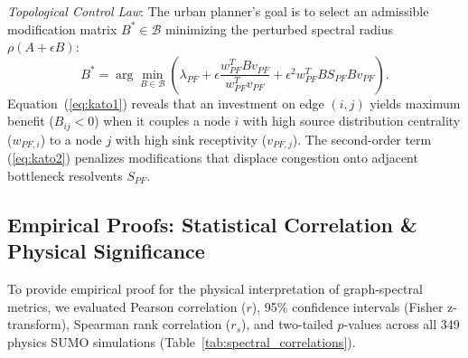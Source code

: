 \documentclass[lettersize,journal]{IEEEtran}
\begin{document}
\textit{Topological Control Law}: The urban planner's goal is to select an admissible modification matrix $B^* \in \mathcal{B}$ minimizing the perturbed spectral radius $\rho(A + \epsilon B)$:
\begin{equation}
B^* = \arg\min_{B \in \mathcal{B}} \left( \lambda_{PF} + \epsilon \frac{w_{PF}^T B v_{PF}}{w_{PF}^T v_{PF}} + \epsilon^2 w_{PF}^T B S_{PF} B v_{PF} \right).
\end{equation}
Equation~(\ref{eq:kato1}) reveals that an investment on edge $(i, j)$ yields maximum benefit ($B_{ij} < 0$) when it couples a node $i$ with high source distribution centrality ($w_{PF, i}$) to a node $j$ with high sink receptivity ($v_{PF, j}$). The second-order term (\ref{eq:kato2}) penalizes modifications that displace congestion onto adjacent bottleneck resolvents $S_{PF}$.

\subsection{Empirical Proofs: Statistical Correlation \& Physical Significance}
To provide empirical proof for the physical interpretation of graph-spectral metrics, we evaluated Pearson correlation ($r$), 95\% confidence intervals (Fisher z-transform), Spearman rank correlation ($r_s$), and two-tailed $p$-values across all 349 physics SUMO simulations (Table~\ref{tab:spectral_correlations}).
\end{document}
